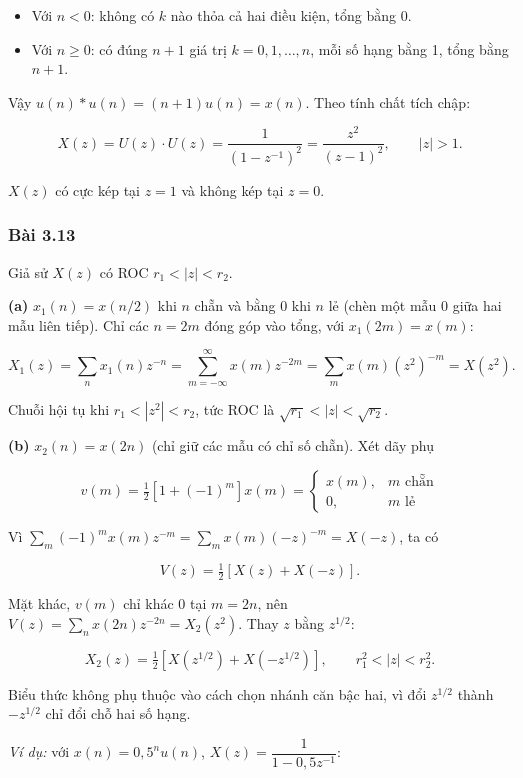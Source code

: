 \documentclass[12pt,a4paper]{article}
\begin{document}
\begin{itemize}
\item
  Với \(n<0\): không có \(k\) nào thỏa cả hai điều kiện, tổng bằng 0.
\item
  Với \(n\ge0\): có đúng \(n+1\) giá trị \(k=0,1,\dots,n\), mỗi số hạng
  bằng 1, tổng bằng \(n+1\).
\end{itemize}

Vậy \(u(n)*u(n)=(n+1)u(n)=x(n)\). Theo tính chất tích chập:

\[X(z)=U(z)\cdot U(z)=\frac{1}{(1-z^{-1})^2}=\frac{z^2}{(z-1)^2},\qquad |z|>1.\]

\(X(z)\) có cực kép tại \(z=1\) và không kép tại \(z=0\).

\subsubsection*{Bài 3.13}
Giả sử \(X(z)\) có ROC \(r_1<|z|<r_2\).

\textbf{(a)} \(x_1(n)=x(n/2)\) khi \(n\) chẵn và bằng 0 khi \(n\) lẻ
(chèn một mẫu 0 giữa hai mẫu liên tiếp). Chỉ các \(n=2m\) đóng góp vào
tổng, với \(x_1(2m)=x(m)\):

\[X_1(z)=\sum_{n}x_1(n)z^{-n}=\sum_{m=-\infty}^{\infty}x(m)z^{-2m}=\sum_{m}x(m)\left(z^{2}\right)^{-m}=X(z^2).\]

Chuỗi hội tụ khi \(r_1<|z^2|<r_2\), tức ROC là
\(\sqrt{r_1}<|z|<\sqrt{r_2}\).

\textbf{(b)} \(x_2(n)=x(2n)\) (chỉ giữ các mẫu có chỉ số chẵn). Xét dãy
phụ

\[v(m)=\tfrac12\left[1+(-1)^m\right]x(m)=\begin{cases}x(m), & m \text{ chẵn}\\ 0, & m \text{ lẻ}\end{cases}\]

Vì \(\sum_m (-1)^m x(m)z^{-m}=\sum_m x(m)(-z)^{-m}=X(-z)\), ta có

\[V(z)=\tfrac12\left[X(z)+X(-z)\right].\]

Mặt khác, \(v(m)\) chỉ khác 0 tại \(m=2n\), nên
\(V(z)=\sum_n x(2n)z^{-2n}=X_2(z^2)\). Thay \(z\) bằng \(z^{1/2}\):

\[X_2(z)=\tfrac12\left[X\!\left(z^{1/2}\right)+X\!\left(-z^{1/2}\right)\right],\qquad r_1^2<|z|<r_2^2.\]

Biểu thức không phụ thuộc vào cách chọn nhánh căn bậc hai, vì đổi
\(z^{1/2}\) thành \(-z^{1/2}\) chỉ đổi chỗ hai số hạng.

\emph{Ví dụ:} với \(x(n)=0{,}5^n u(n)\), \(X(z)=\dfrac{1}{1-0{,}5z^{-1}}\):
\end{document}
